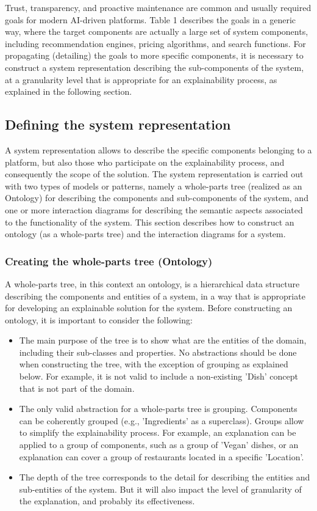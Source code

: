 \documentclass[preprint,10pt]{elsarticle}
\begin{document}
Trust, transparency, and proactive maintenance are common and usually required goals for modern AI-driven platforms. Table 1 describes the goals in a generic way, where the target components are actually a large set of system components, including recommendation engines, pricing algorithms, and search functions. For propagating (detailing) the goals to more specific components, it is necessary to construct a system representation describing the sub-components of the system, at a granularity level that is appropriate for an explainability process, as explained in the following section.

\subsection{Defining the system representation}

A system representation allows to describe the specific components belonging to a platform, but also those who participate on the explainability process, and consequently the scope of the solution. The system representation is carried out with two types of models or patterns, namely a whole-parts tree (realized as an Ontology) for describing the components and sub-components of the system, and one or more interaction diagrams for describing the semantic aspects associated to the functionality of the system. This section describes how to construct an ontology (as a whole-parts tree) and the interaction diagrams for a system.

\subsubsection{Creating the whole-parts tree (Ontology)}

A whole-parts tree, in this context an ontology, is a hierarchical data structure describing the components and entities of a system, in a way that is appropriate for developing an explainable solution for the system. Before constructing an ontology, it is important to consider the following:

\begin{itemize}
    \item The main purpose of the tree is to show what are the entities of the domain, including their sub-classes and properties. No abstractions should be done when constructing the tree, with the exception of grouping as explained below. For example, it is not valid to include a non-existing 'Dish' concept that is not part of the domain.
    \item The only valid abstraction for a whole-parts tree is grouping. Components can be coherently grouped (e.g., 'Ingredients' as a superclass). Groups allow to simplify the explainability process. For example, an explanation can be applied to a group of components, such as a group of 'Vegan' dishes, or an explanation can cover a group of restaurants located in a specific 'Location'.
    \item The depth of the tree corresponds to the detail for describing the entities and sub-entities of the system. But it will also impact the level of granularity of the explanation, and probably its effectiveness.
\end{itemize}
\end{document}
